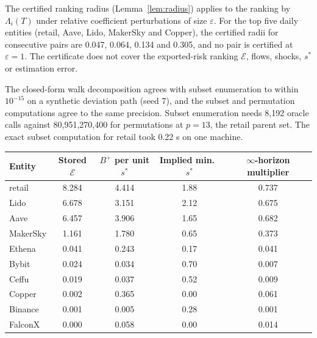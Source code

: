 \documentclass[referee,pdflatex,sn-mathphys-ay]{sn-jnl}
\newcommand{\fitbox}{\ifdim\wd\tabbox>\linewidth\resizebox{\linewidth}{!}{\usebox{\tabbox}}\else\usebox{\tabbox}\fi}%
\theoremstyle{thmstyleone}%
\theoremstyle{thmstyletwo}%
\theoremstyle{thmstylethree}%
\begin{document}
\begin{appendices}
The certified ranking radius (Lemma~\ref{lem:radius}) applies to the ranking by $\Lambda_i(T)$ under relative coefficient
perturbations of size $\varepsilon$. For the top five daily entities (retail, Aave, Lido, MakerSky and Copper), the certified radii
for consecutive pairs are 0.047, 0.064, 0.134 and 0.305, and no pair is certified at $\varepsilon=1$.
The certificate does not cover the exported-risk ranking $\mathcal{E}$, flows, shocks, $s^\ast$ or estimation error.

The closed-form walk decomposition agrees with subset enumeration to within $10^{-15}$ on a synthetic deviation path (seed
7), and the subset and permutation computations agree to the same precision. Subset enumeration needs 8{,}192 oracle calls
against 80{,}951{,}270{,}400 for permutations at $p=13$, the retail parent set. The exact subset computation for retail took 0.22 s on one machine.

\begin{lrbox}{\tabbox}\footnotesize\setlength{\tabcolsep}{3pt}%
\begin{tabular}{@{}lcccc@{}}
\toprule
\textbf{Entity} & \textbf{Stored $\mathcal{E}$} & \textbf{$B^+$ per unit $s^\ast$} & \textbf{Implied min.\ $s^\ast$} & \textbf{$\infty$-horizon multiplier}\\
\midrule
retail & 8.284 & 4.414 & 1.88 & 0.737 \\
Lido & 6.678 & 3.151 & 2.12 & 0.675 \\
Aave & 6.457 & 3.906 & 1.65 & 0.682 \\
MakerSky & 1.161 & 1.780 & 0.65 & 0.373 \\
Ethena & 0.041 & 0.243 & 0.17 & 0.041 \\
Bybit & 0.024 & 0.034 & 0.70 & 0.007 \\
Ceffu & 0.019 & 0.037 & 0.52 & 0.009 \\
Copper & 0.002 & 0.365 & 0.00 & 0.061 \\
Binance & 0.001 & 0.005 & 0.28 & 0.001 \\
FalconX & 0.000 & 0.058 & 0.00 & 0.014 \\
\bottomrule
\end{tabular}
\end{lrbox}
\begin{tableorg}[tbp]
\centering
\caption{Flow-free bounds on exported risk, daily specification ($T=7$), bounded entities only.}
\label{tab:bounds}
\fitbox
\end{tableorg}

\end{appendices}

{\footnotesize\linespread{1.05}\selectfont
}
\end{document}
